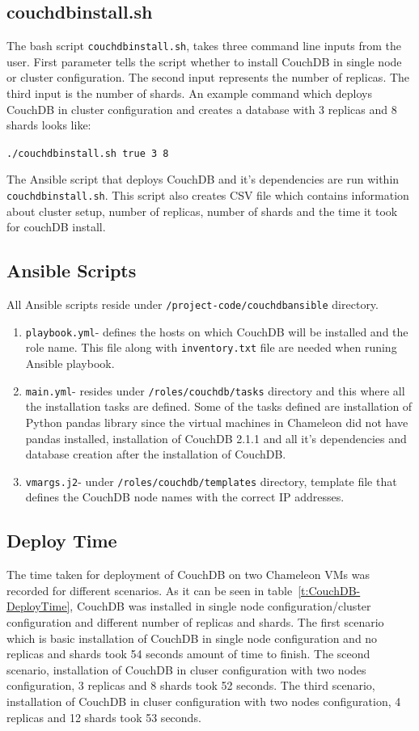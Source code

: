 \subsection{couchdbinstall.sh}

The bash script \verb|couchdbinstall.sh|, takes three command line inputs
from the user. First parameter tells the script whether to install
CouchDB in single node or cluster configuration. The second input
represents the
number of replicas. The third input is the number of shards. An
example command which deploys CouchDB in cluster configuration and creates a database with 3
replicas and 8 shards looks like:

\verb|./couchdbinstall.sh true 3 8|


The Ansible script that deploys CouchDB and it's dependencies are run
within \verb|couchdbinstall.sh|. This script also creates CSV file which
contains information about cluster setup, number of replicas, number
of shards and the time it took for couchDB install.

\subsection{Ansible Scripts}
All Ansible scripts reside under \verb|/project-code/couchdbansible|
directory. 
\begin{enumerate}
  \item \verb|playbook.yml|- defines the hosts on which CouchDB will be
    installed and the role name. This file along with \verb|inventory.txt|
    file are needed when runing Ansible playbook.

  \item \verb|main.yml|- resides under \verb|/roles/couchdb/tasks|
    directory and this where all the installation tasks are
    defined. Some of the tasks defined are installation of Python
    pandas library since the virtual machines in Chameleon did not have pandas
    installed, installation of CouchDB 2.1.1 and all it's dependencies
    and database creation after the installation of CouchDB.

  \item \verb|vmargs.j2|- under \verb|/roles/couchdb/templates| directory, template
    file that defines the CouchDB node names with the correct IP addresses.
\end{enumerate}

\subsection{Deploy Time}
The time taken for deployment of CouchDB on two Chameleon VMs was recorded for different
scenarios. As it can be seen in table~\ref{t:CouchDB-DeployTime},
CouchDB was installed in single node configuration/cluster configuration and different
number of replicas and shards. The first scenario which is basic installation of CouchDB
in single node configuration and no replicas and shards took 54 seconds
amount of time to finish. The sceond scenario, installation of CouchDB
in cluser configuration with two nodes configuration, 3 replicas and
8 shards took 52 seconds. The third scenario, installation of CouchDB
in cluser configuration with two nodes configuration, 4 replicas and
12 shards took 53 seconds. 

